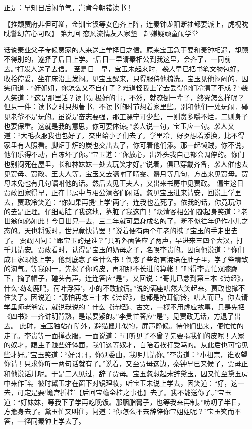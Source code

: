 \documentclass[12pt,oneside]{book}
\begin{document}
正是：早知日后闲争气，岂肯今朝错读书！
 
【推颓贾府非但可卿，金钏宝钗等女色齐上阵，连秦钟龙阳断袖都要派上，虎视眈眈警幻苦心可叹】
第九回  恋风流情友入家塾　起嫌疑顽童闹学堂


话说秦业父子专候贾家的人来送上学择日之信。原来宝玉急于要和秦钟相遇，却顾不得别的，遂择了后日上学。“后日一早请秦相公到我这里，会齐了，一同前去。”打发人送了去信。
至是日一早，宝玉未起来时，袭人早已把书笔文物包好，收拾停妥，坐在床沿上发闷。见宝玉醒来，只得服侍他梳洗。宝玉见他闷闷的，因笑问道：“好姐姐，你怎么又不自在了？难道怪我上学去丢得你们冷清了不成？”袭人笑道：“这是那里话？读书是极好的事，不然，就潦倒一辈子，终究怎么样呢？但只一件：读书之时只想著书，不读书的时节想着家里些。别和他们一处玩闹，碰见老爷不是玩的。虽说是奋志要强，那工课宁可少些，一则贪多嚼不烂，二则身子也要保重。这就是我的意思，你可要体谅。”袭人说一句，宝玉应一句。袭人又道：“大毛衣服我也包好了，交出给小子们去了。学里冷，好歹想着添换，比不得家里有人照看。脚炉手炉的炭也交出去了，你可着他们添。那一起懒贼，你不说，他们乐得不动，白冻坏了你。”宝玉道：“你放心，出外头我自己都会调停的。你们也别闷死在屋里，长和林妹妹一处去玩笑才好。”说着，俱已穿戴齐备，袭人催他去见贾母、贾政、王夫人等。宝玉又去嘱咐了晴雯、麝月等几句，方出来见贾母。贾母未免也有几句嘱咐他的话。然后去见王夫人，又出来书房中见贾政。
偏生这日贾政回家得早，正在书房中与相公清客们闲话。忽见宝玉进来请安，回说上学里去，贾政冷笑道：“你如果再提‘上学’两字，连我也羞死了。依我的话，你竟玩你的去是正理。仔细站脏了我这地，靠脏了我这门！”众清客相公们都起身笑道：“老世翁何必如此！今日世兄一去，三二年就可显身成名的了，断不似往年仍作小儿之态的。天也将饭时，世兄竟快请罢！”说着便有两个年老的携了宝玉的手走出去了。
贾政因问：“跟宝玉的是谁？”只听外面答应了两声，早进来三四个大汉，打千儿请安。贾政看时，认得是宝玉的奶母之子，名唤李贵的。因向他说道：“你们成日家跟他上学，他到底念了些什么书！倒念了些胡言混语在肚子里，学了些精致的淘气。等我闲一，先揭了你的皮，再和那不长进的算帐！”吓得李贵忙双膝跪下，摘了帽子，碰头有声，连连答应“是”，又回说：“哥儿已念到第三本《诗经》，什么‘呦呦鹿鸣，荷叶浮萍’，小的不敢撒谎。”说的满座哄然大笑起来。贾政也撑不住笑了。因说道：“那怕再念三十本《诗经》，也都是掩耳偷铃，哄人而已。你去请学里师老爷安，就说我说的：什么《诗经》、古文，一概不用虚应故事，只是先把《四书》一齐讲明背熟，是最要紧的。”李贵忙答应“是”，见贾政无话，方退了出去。
此时，宝玉独站在院外，避猫鼠儿似的，屏声静候。待他们出来，便忙忙的走了。李贵等一面掸衣服，一面说道：“可听见了不曾？先要揭我们的皮呢！人家的奴才，跟主子赚些好体面，我们这等奴才，白陪着挨打受骂的。从此后也可怜见些才好。”宝玉笑道：“好哥哥，你别委曲，我明儿请你。”李贵道：“小祖宗，谁敢望你请！只求你听一两句话就有了。”说着，又至贾母这边，秦钟早已来候了，贾母正和他说话儿呢。于是二人见过，辞了贾母。宝玉忽想起未辞黛玉，因又忙至黛玉房中来作辞。彼时黛玉才在窗下对镜理妆，听宝玉未说上学去，因笑道：“好，这一去，可定是要‘蟾宫折桂’【后回宝蟾金桂之事也】去了。我不能送你了。”宝玉道：“好妹妹，等我下了学再吃晚饭。那胭脂膏子，也等我来再制。”唠叨了半日，方撤身去了。黛玉忙又叫住，问道：“你怎么不去辞辞你宝姐姐呢？”宝玉笑而不答，一径同秦钟上学去了。
\end{document}
